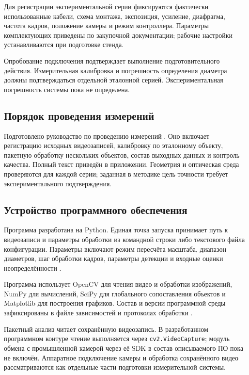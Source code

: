 \documentclass[12pt,a4paper]{article}
\begin{document}
Для регистрации экспериментальной серии фиксируются фактически использованные кабели, схема монтажа, экспозиция, усиление, диафрагма, частота кадров, положение камеры и режим контроллера. Параметры комплектующих приведены по закупочной документации; рабочие настройки устанавливаются при подготовке стенда.

Опробование подключения подтверждает выполнение подготовительного действия. Измерительная калибровка и погрешность определения диаметра должны подтверждаться отдельной эталонной серией. Экспериментальная погрешность системы пока не определена.

\subsection{Порядок проведения измерений}
Подготовлено руководство по проведению измерений \cite{manualv2}. Оно включает регистрацию исходных видеозаписей, калибровку по эталонному объекту, пакетную обработку нескольких объектов, состав выходных данных и контроль качества. Полный текст приведён в приложении. Геометрия и оптическая среда проверяются для каждой серии; заданная в методике цель точности требует экспериментального подтверждения.

\subsection{Устройство программного обеспечения}
Программа разработана на Python. Единая точка запуска  принимает путь к видеозаписи и параметры обработки из командной строки либо текстового файла конфигурации. Параметры включают режим пересчёта масштаба, диапазон диаметров, шаг обработки кадров, параметры детекции и входные оценки неопределённости \cite{code}.

Программа использует OpenCV для чтения видео и обработки изображений, NumPy для вычислений, SciPy для глобального сопоставления объектов и Matplotlib для построения графиков. Состав и версии программной среды зафиксированы в файле зависимостей и протоколах обработки \cite{code}.

Пакетный анализ читает сохранённую видеозапись. В разработанном программном контуре чтение выполняется через \texttt{cv2.VideoCapture}; модуль обмена с промышленной камерой через её SDK в состав описываемого ПО пока не включён. Аппаратное подключение камеры и обработка сохранённого видео рассматриваются как отдельные части подготовки измерительной системы.
\end{document}
